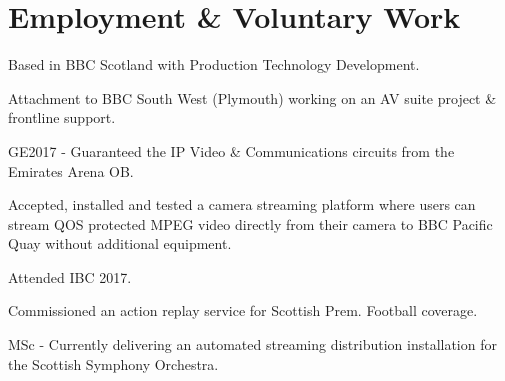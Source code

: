 \documentclass[]{deedy-resume-openfont}
\begin{document}
\hfill
\begin{minipage}[t]{0.66\textwidth} 


\section{Employment \& Voluntary Work}

\vspace{\topsep} %
\begin{tightemize}
\item Based in BBC Scotland with Production Technology Development.
\item Attachment to BBC South West (Plymouth) working on an AV suite project \& frontline support.
\item GE2017 - Guaranteed the IP Video \& Communications circuits from the Emirates Arena OB.
\item Accepted, installed and tested a camera streaming platform where users can stream QOS protected MPEG video directly from their camera to BBC Pacific Quay without additional equipment.
\item Attended IBC 2017.
\item Commissioned an action replay service for Scottish Prem. Football coverage.
\item MSc - Currently delivering an automated streaming distribution installation for the Scottish Symphony Orchestra.
\end{tightemize}
\sectionsep


\end{minipage}
\end{document}
